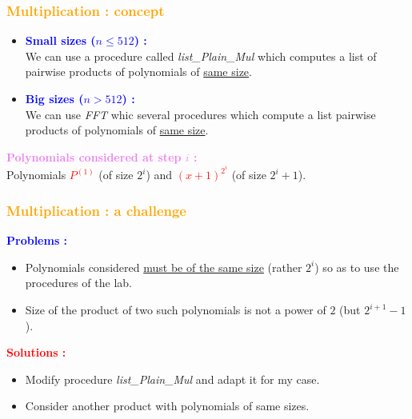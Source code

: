 \begin{frame}[fragile]
\frametitle{\textbf{\textcolor{orange}{Multiplication : concept}}}

\begin{block}{}
\begin{itemize}
\item \textcolor{blue}{\textbf{Small sizes ($n \leq 512$) :}}\\
\hspace{4mm}
We can use a procedure called \textit{list\_Plain\_Mul} which computes a list of pairwise products of polynomials of \underline{same size}.
\item \textcolor{blue}{\textbf{Big sizes ($n > 512$) :}}\\
\hspace{4mm}
We can use \textit{FFT} whic several procedures which compute a list pairwise products of polynomials of \underline{same size}.
\end{itemize}
\end{block}

\begin{block}{}
\textcolor{violet}{\textbf{Polynomials considered at step $i$ :}}\\
Polynomials \textcolor{red}{$P^{(1)}$} (of size $2^{i}$) and \textcolor{red}{$(x+1)^{2^i}$} (of size $2^{i} + 1$).
\end{block}

\end{frame}

\begin{frame}[fragile]
\frametitle{\textbf{\textcolor{orange}{Multiplication : a challenge}}}

\begin{block}{}
\textcolor{blue}{\textbf{Problems :}}
\hspace{3mm}
\begin{itemize}
\item Polynomials considered \underline{must be of the same size} (rather $2^{i}$) so as to use the procedures of the lab.
\item Size of the product of two such polynomials is not a power of $2$ (but $2^{i+1} - 1$).
\end{itemize}
\end{block}

\begin{block}{}
\textcolor{red}{\textbf{Solutions :}}
\hspace{3mm}
\begin{itemize}
\item Modify procedure \textit{list\_Plain\_Mul} and adapt it for my case.
\item Consider another product with polynomials of same sizes.
\end{itemize}
\end{block}

\end{frame}


